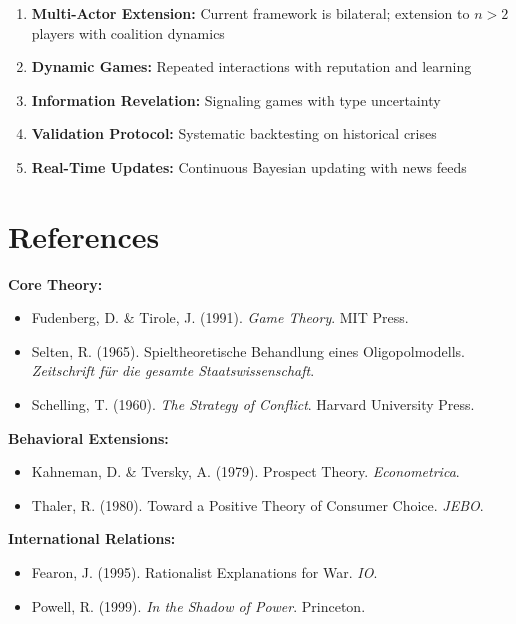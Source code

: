 \begin{enumerate}
\item \textbf{Multi-Actor Extension:} Current framework is bilateral; extension to $n > 2$ players with coalition dynamics
\item \textbf{Dynamic Games:} Repeated interactions with reputation and learning
\item \textbf{Information Revelation:} Signaling games with type uncertainty
\item \textbf{Validation Protocol:} Systematic backtesting on historical crises
\item \textbf{Real-Time Updates:} Continuous Bayesian updating with news feeds
\end{enumerate}



\section{References}
\label{sec:crisis-refs}

\textbf{Core Theory:}
\begin{itemize}
\item Fudenberg, D. \& Tirole, J. (1991). \textit{Game Theory}. MIT Press.
\item Selten, R. (1965). Spieltheoretische Behandlung eines Oligopolmodells. \textit{Zeitschrift für die gesamte Staatswissenschaft}.
\item Schelling, T. (1960). \textit{The Strategy of Conflict}. Harvard University Press.
\end{itemize}

\textbf{Behavioral Extensions:}
\begin{itemize}
\item Kahneman, D. \& Tversky, A. (1979). Prospect Theory. \textit{Econometrica}.
\item Thaler, R. (1980). Toward a Positive Theory of Consumer Choice. \textit{JEBO}.
\end{itemize}

\textbf{International Relations:}
\begin{itemize}
\item Fearon, J. (1995). Rationalist Explanations for War. \textit{IO}.
\item Powell, R. (1999). \textit{In the Shadow of Power}. Princeton.
\end{itemize}


